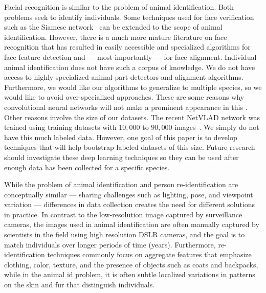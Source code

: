         Facial recognition is similar to the problem of animal identification.
        Both problems seek to identify individuals. Some techniques used for face verification such as the Siamese
        network~\cite{chopra_learning_2005, taigman_deepface_2014} can be extended to the scope of animal
        identification. However, there is a much more mature literature on face recognition that has resulted in easily
        accessible and specialized algorithms for face feature detection and --- most importantly --- for face
        alignment. Individual animal identification does not have such a corpus of knowledge. We do not have access to
        highly specialized animal part detectors and alignment algorithms. Furthermore, we would like our algorithms to
        generalize to multiple species, so we would like to avoid over-specialized approaches. These are some reasons
        why convolutional neural networks will not make a prominent appearance in this \thesis{}. Other reasons involve
        the size of our datasets. The recent NetVLAD network was trained using training datasets with $10,000$ to
        $90,000$ images~\cite{arandjelovic_netvlad_2015}. We simply do not have this much labeled data. However, one
        goal of this paper is to develop techniques that will help bootstrap labeled datasets of this size. Future
        research should investigate these deep learning techniques so they can be used after enough data has been
        collected for a specific species.

        While the problem of animal identification and person re-identification are conceptually similar --- sharing
        challenges such as lighting, pose, and viewpoint variation --- differences in data collection creates the need
        for different solutions in practice. In contrast to the low-resolution image captured by surveillance cameras,
        the images used in animal identification are often manually captured by scientists in the field using high
        resolution DSLR cameras, and the goal is to match individuals over longer periods of time (years). Furthermore,
        re-identification techniques commonly focus on aggregate features that emphasize clothing, color, texture, and
        the presence of objects such as coats and backpacks, while in the animal id problem, it is often subtle
        localized variations in patterns on the skin and fur that distinguish individuals.


